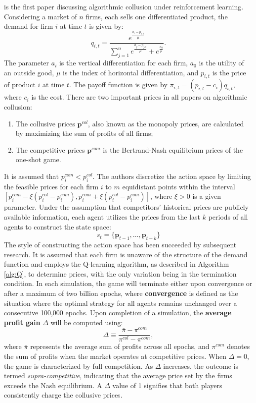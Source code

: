 \documentclass[mnsc,nonblindrev]{workingpaper}
\begin{document}
\cite{calvano2020artificial} is the first paper discussing algorithmic collusion under reinforcement learning. Considering a market of $n$ firms, each sells one differentiated product, the demand for firm $i$ at time $t$ is given by:  
\begin{equation}
	q_{i,t}=\frac{e^{\frac{a_i-p_{i,t}}\mu}}{\sum_{j=1}^ne^{\frac{a_j-p_{j,t}}\mu}+e^{\frac{a_0}\mu}}.
\end{equation}
The parameter $a_i$ is the vertical differentiation for each firm, $a_0$ is the utility of an outside good, $\mu$ is the index of horizontal differentiation, and $p_{i,t}$ is the price of product $i$ at time $t$. The payoff function is given by $\pi_{i,t}=(p_{i,t}-c_i)q_{i,t}$, where $c_i$ is the cost. There are two important prices in all papers on algorithmic collusion:
\begin{enumerate}
	\item The collusive prices $\mathbf{p}^{col}$, also known as the monopoly prices, are calculated by maximizing the sum of profits of all firms;
	\item The competitive prices $\mathbf{p}^{com}$ is the Bertrand-Nash equilibrium prices of the one-shot game.
\end{enumerate}
It is assumed that $p_i^{com}<p_i^{col}$. The authors discretize the action space by limiting the feasible prices for each firm $i$ to $m$ equidistant points within the interval $[p_i^{com}-\xi(p_i^{col}-p_i^{com}), p_i^{com}+\xi(p_i^{col}-p_i^{com})]$, where $\xi>0$ is a given parameter. Under the assumption that competitors' historical prices are publicly available information, each agent utilizes the prices from the last $k$ periods of all agents to construct the state space:
\[
	s_t = \{\mathbf{p}_{t-1},\ldots,\mathbf{p}_{t-k}\}
\]
The style of constructing the action space has been succeeded by subsequent research. It is assumed that each firm is unaware of the structure of the demand function and employs the Q-learning algorithm, as described in Algorithm \ref{alg:Q}, to determine prices, with the only variation being in the termination condition. In each simulation, the game will terminate either upon convergence or after a maximum of two billion epochs, where \textbf{convergence} is defined as the situation where the optimal strategy for all agents remains unchanged over a consecutive 100,000 epochs. Upon completion of a simulation, the \textbf{average profit gain} $\Delta$ will be computed using:
\begin{equation}
	\Delta\equiv\frac{\bar{\pi}-\pi^{com}}{\pi^{col}-\pi^{com}},
\end{equation}
where $\bar\pi$ represents the average sum of profits across all epochs, and $\pi^{com}$ denotes the sum of profits when the market operates at competitive prices. When $\Delta=0$, the game is characterized by full competition. As $\Delta$ increases, the outcome is termed \textit{supra-competitive}, indicating that the average price set by the firms exceeds the Nash equilibrium. A $\Delta$ value of 1 signifies that both players consistently charge the collusive prices. 
\end{document}
